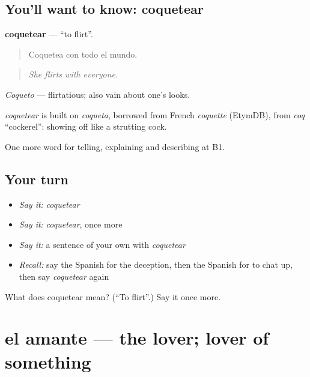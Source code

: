 \subsection*{You'll want to know: coquetear}
\textbf{coquetear} — \textquotedblleft{}to flirt\textquotedblright{}.

\begin{quote}
Coquetea con todo el mundo.
\end{quote}

\begin{quote}
\emph{She flirts with everyone.}
\end{quote}

\emph{Coqueto} — flirtatious; also vain about one's looks.

\begin{cousinweb}
\emph{coquetear} is built on \emph{coqueta}, borrowed from French \emph{coquette} (EtymDB), from \emph{coq} \textquotedblleft{}cockerel\textquotedblright{}: showing off like a strutting cock.
\end{cousinweb}

\begin{grammarlens}[title={What you've built}]
One more word for telling, explaining and describing at B1.
\end{grammarlens}

\subsection*{Your turn}
\begin{itemize}
\raggedright
  \item \emph{Say it:} \emph{coquetear}
  \item \emph{Say it:} \emph{coquetear}, once more
  \item \emph{Say it:} a sentence of your own with \emph{coquetear}
  \item \emph{Recall:} say the Spanish for the deception, then the Spanish for to chat up, then say \emph{coquetear} again
\end{itemize}

\begin{tcolorbox}[breakable,colback=teal!4,colframe=teal!35!black,title={Before you move on}]
What does coquetear mean? (\textquotedblleft{}To flirt\textquotedblright{}.) Say it once more.
\end{tcolorbox}
\section[el amante]{el amante — the lover; lover of something}


